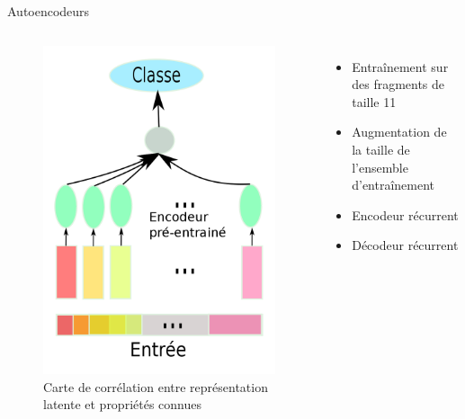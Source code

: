 \documentclass{beamer}
\begin{document}
\begin{frame}{Autoencodeurs}

  \begin{columns}
    \begin{figure}
      \centering
      \includegraphics[scale=0.1]{../Figures/Class}
      \caption{Carte de corrélation entre représentation latente et propriétés connues}
    \end{figure}

    \begin{itemize}
    \item Entraînement sur des fragments de taille 11\pause
    \item Augmentation de la taille de l'ensemble d'entraînement\pause
    \item Encodeur \alert{récurrent}\pause
    \item Décodeur récurrent
    \end{itemize}
  \end{columns}
  
\end{frame}
\end{document}
